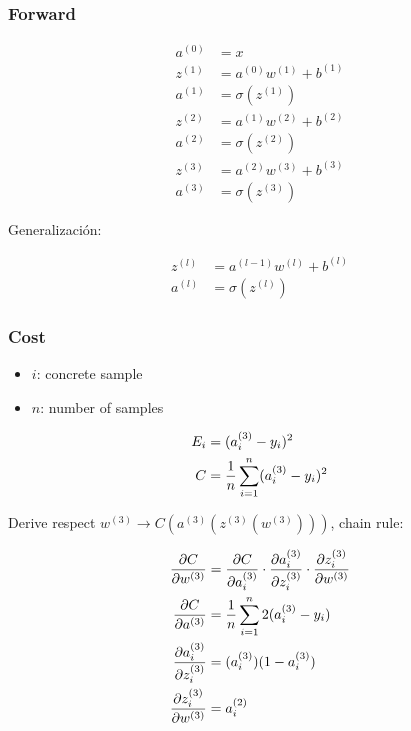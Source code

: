 \documentclass{article}
\begin{document}
\subsubsection{Forward}

\begin{align}
    a^{(0)} &= x \\
    z^{(1)} &= a^{(0)}w^{(1)}+b^{(1)} \\
    a^{(1)} &= \sigma(z^{(1)}) \\
    z^{(2)} &= a^{(1)}w^{(2)}+b^{(2)} \\
    a^{(2)} &= \sigma(z^{(2)}) \\
    z^{(3)} &= a^{(2)}w^{(3)}+b^{(3)} \\
    a^{(3)} &= \sigma(z^{(3)})
\end{align}

Generalización:

\begin{align}
    z^{(l)} &= a^{(l-1)}w^{(l)}+b^{(l)} \\
    a^{(l)} &= \sigma(z^{(l)})
\end{align}

\subsubsection{Cost}

\begin{itemize}
\item $i$: concrete sample
\item $n$: number of samples
\end{itemize}

\begin{align}
E_i &= (a_i^{(3)} - y_i)^2 \\
C &= \avgsum[i,n] (a_i^{(3)} - y_i)^2
\end{align}

\pagebreak

Derive respect $w^{(3)} \rightarrow C(a^{(3)}(z^{(3)}(w^{(3)})))$,
chain rule:

\begin{align}
\pd{C}{w^{(3)}} &= \pd{C}{a_i^{(3)}}\cdot\pd{a_i^{(3)}}{z_i^{(3)}}\cdot\pd{z_i^{(3)}}{w^{(3)}} \\
\pd{C}{a^{(3)}} &= \avgsum[i,n] 2 (a_i^{(3)} - y_i) \\
\pd{a_i^{(3)}}{z_i^{(3)}} &= ({a_i^{(3)}}) (1-{a_i^{(3)}}) \\
\pd{z_i^{(3)}}{w^{(3)}} & = a_i^{(2)}
\end{align}
\end{document}
